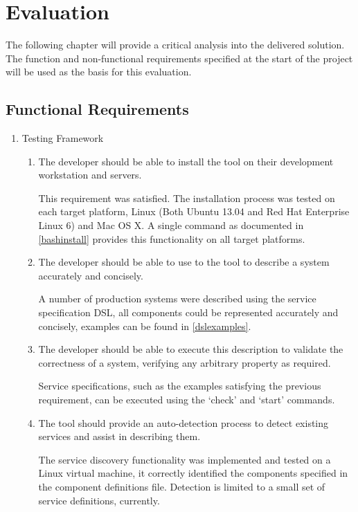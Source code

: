 \documentclass{cshonours}
\begin{document}
\chapter{Evaluation}

The following chapter will provide a critical analysis into the delivered solution. The function and non-functional requirements specified at the start of the project will be used as the basis for this evaluation.

\section{Functional Requirements}
\newcommand\litem[1]{\vspace{0.2cm} \item #1 \vspace{0.2cm}}
  \begin{enumerate}
    \item Testing Framework
    \begin{enumerate}
        \litem{The developer should be able to install the tool on their development workstation and servers.}

        This requirement was satisfied. The installation process was tested on each target platform, Linux (Both Ubuntu 13.04 and Red Hat Enterprise Linux 6) and Mac OS X. A single command as documented in \autoref{bashinstall} provides this functionality on all target platforms.

        \litem{The developer should be able to use to the tool to describe a system accurately and concisely.}

        A number of production systems were described using the service specification DSL, all components could be represented accurately and concisely, examples can be found in \autoref{dslexamples}.

      \litem{The developer should be able to execute this description to validate the correctness of a system, verifying any arbitrary property as required.}

        Service specifications, such as the examples satisfying the previous requirement, can be executed using the `check' and `start' commands.

      \litem{The tool should provide an auto-detection process to detect existing services and assist in describing them.}

        The service discovery functionality was implemented and tested on a Linux virtual machine, it correctly identified the components specified in the component definitions file. Detection is limited to a small set of service definitions, currently.


\end{enumerate}
\end{enumerate}
\end{document}
